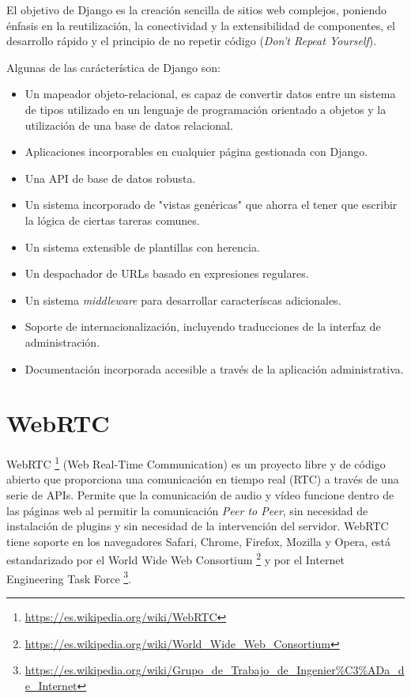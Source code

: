 \documentclass[a4paper, 12pt]{book}
\begin{document}
El objetivo de Django es la creación sencilla de sitios web complejos, poniendo énfasis en la reutilización, la conectividad y la extensibilidad de componentes, el desarrollo rápido y el principio de no repetir código (\textit{Don't Repeat Yourself}).

Algunas de las carácterística de Django son:

\begin{itemize}
\item Un mapeador objeto-relacional, es capaz de convertir datos entre un sistema de tipos utilizado en un lenguaje de programación orientado a objetos y la utilización de una base de datos relacional.

\item Aplicaciones incorporables en cualquier página gestionada con Django.

\item Una API de base de datos robusta.

\item Un sistema incorporado de "vistas genéricas" que ahorra el tener que escribir la lógica de ciertas tareras comunes.

\item Un sistema extensible de plantillas con herencia.

\item Un despachador de URLs basado en expresiones regulares.

\item Un sistema \textit{middleware} para desarrollar caracteríscas adicionales.

\item Soporte de internacionalización, incluyendo traducciones de la interfaz de administración.

\item Documentación incorporada accesible a través de la aplicación administrativa.
\end{itemize}

\section{WebRTC}
\label{sec:webrtc}

WebRTC \footnote{\url{https://es.wikipedia.org/wiki/WebRTC}} \cite{webrtc} (Web Real-Time Communication) es un proyecto libre y de código abierto que proporciona una comunicación en tiempo real (RTC) a través de una serie de APIs. Permite que la comunicación de audio y vídeo funcione dentro de las páginas web al permitir la comunicación \textit{Peer to Peer}, sin necesidad de instalación de plugins y sin necesidad de la intervención del servidor. WebRTC tiene soporte en los navegadores Safari, Chrome, Firefox, Mozilla y Opera, está estandarizado por el World Wide Web Consortium \footnote{\url{https://es.wikipedia.org/wiki/World_Wide_Web_Consortium}} y por el Internet Engineering Task Force \footnote{\url{https://es.wikipedia.org/wiki/Grupo_de_Trabajo_de_Ingenier\%C3\%ADa_de_Internet}}.
\end{document}
